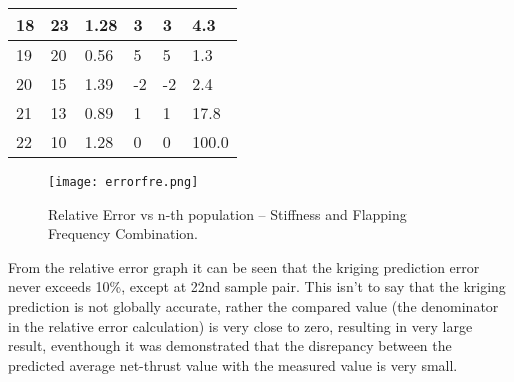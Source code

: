 \begin{table}[H]
\begin{tabular}{|l|l|l|l|l|l|}
\hline
18                  & 23                                                             & 1.28                                                             & 3         & 3                                                                           & 4.3                                                                             \\ 
\hline
19                  & 20                                                             & 0.56                                                             & 5         & 5                                                                           & 1.3                                                                             \\ 
\hline
20                  & 15                                                             & 1.39                                                             & -2        & -2                                                                          & 2.4                                                                             \\ 
\hline
21                  & 13                                                             & 0.89                                                             & 1         & 1                                                                           & 17.8                                                                            \\ 
\hline
22                  & 10                                                           & 1.28                                                             & 0         & 0                                                                           & 100.0                                                                           \\
\hline
\end{tabular}
\label{tab:tableresultfre}
\end{table}
\begin{figure}[H]
    \centering
    \texttt{[image: errorfre.png]}
    \caption{Relative Error vs n-th population -- Stiffness and Flapping Frequency Combination.}
    \label{fig:errorfre}
\end{figure}
From the relative error graph it can be seen that the kriging prediction error never exceeds 10\%, except at 22nd sample pair. This isn't to say that the kriging prediction is not globally accurate, rather the compared value (the denominator in the relative error calculation) is very close to zero, resulting in very large result, eventhough it was demonstrated that the disrepancy between the predicted average net-thrust value with the measured value is very small.

